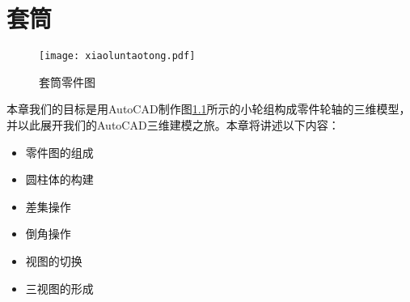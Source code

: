 \chapter{套筒}
\begin{figure}[htbp]
\centering
\texttt{[image: xiaoluntaotong.pdf]}
\caption{套筒零件图}\label{fig:xiaoluntaotong}
\end{figure}
本章我们的目标是用AutoCAD制作图\ref{fig:xiaoluntaotong}所示的小轮组构成零件轮轴的三维模型，并以此展开我们的AutoCAD三维建模之旅。本章将讲述以下内容：
\begin{itemize}
	\item 零件图的组成
	\item 圆柱体的构建
	\item 差集操作
	\item 倒角操作
	\item 视图的切换
	\item 三视图的形成
\end{itemize}





\endinput